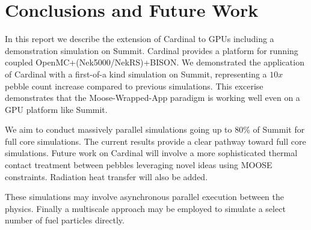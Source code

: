 
\section{Conclusions and Future Work}
\label{s:sum}

In this report we describe the extension of Cardinal to GPUs including a demonstration simulation on Summit. Cardinal provides a platform for running coupled OpenMC+(Nek5000/NekRS)+BISON. We demonstrated the application of Cardinal with a first-of-a kind simulation on Summit, representing a $10x$ pebble count increase compared to previous simulations. This excerise demonstrates that the Moose-Wrapped-App paradigm is working well even on a GPU platform like Summit.

We aim to conduct massively parallel simulations going up to 80\% of Summit for full core simulations. The current results provide a clear pathway toward full core simulations. Future work on Cardinal will involve a more sophisticated thermal contact treatment between pebbles leveraging novel ideas using MOOSE constraints. Radiation heat transfer will also be added.

These simulations may involve asynchronous parallel execution between the
physics. Finally a multiscale approach may be employed to simulate a select number of fuel particles directly.
